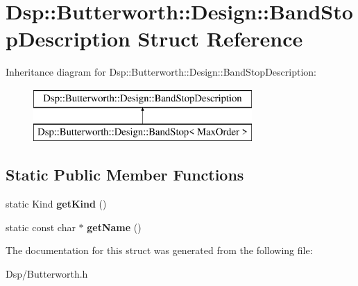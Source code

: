 \hypertarget{structDsp_1_1Butterworth_1_1Design_1_1BandStopDescription}{\section{Dsp\-:\-:Butterworth\-:\-:Design\-:\-:Band\-Stop\-Description Struct Reference}
\label{structDsp_1_1Butterworth_1_1Design_1_1BandStopDescription}
}
Inheritance diagram for Dsp\-:\-:Butterworth\-:\-:Design\-:\-:Band\-Stop\-Description\-:\begin{figure}[H]
\begin{center}
\leavevmode
\includegraphics[height=2.000000cm]{structDsp_1_1Butterworth_1_1Design_1_1BandStopDescription}
\end{center}
\end{figure}
\subsection*{Static Public Member Functions}
\begin{DoxyCompactItemize}
\item 
\hypertarget{structDsp_1_1Butterworth_1_1Design_1_1BandStopDescription_aabbd0ea9e38032c1ef10579f2ffc8c56}{static Kind {\bfseries get\-Kind} ()}\label{structDsp_1_1Butterworth_1_1Design_1_1BandStopDescription_aabbd0ea9e38032c1ef10579f2ffc8c56}

\item 
\hypertarget{structDsp_1_1Butterworth_1_1Design_1_1BandStopDescription_afa0d898b282f4ee8a343ae1a0afcb79a}{static const char $\ast$ {\bfseries get\-Name} ()}\label{structDsp_1_1Butterworth_1_1Design_1_1BandStopDescription_afa0d898b282f4ee8a343ae1a0afcb79a}

\end{DoxyCompactItemize}


The documentation for this struct was generated from the following file\-:\begin{DoxyCompactItemize}
\item 
Dsp/Butterworth.\-h\end{DoxyCompactItemize}
